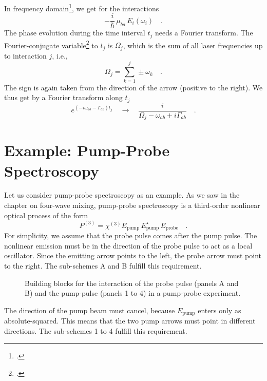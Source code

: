 In frequency domain\footcite{Boyd2008,Shen2003}, we get for the interactions
\begin{equation}
 - \frac{i}{\hbar} \, \mu_{ba} \, E_i(\omega_i)   \quad .
\end{equation}
The phase evolution during the time interval $t_j$ needs a Fourier transform.  The Fourier-conjugate variable\footcite{Tokmakoff09} to $t_j$  is $\Omega_j$, which is the sum of all laser frequencies up to interaction $j$, i.e.,
\begin{equation}
 \Omega_j = \sum_{k=1}^j \pm \omega_k \quad .
\end{equation}
The sign is again taken from the direction of the arrow (positive to the right). We thus get by a Fourier transform  along $t_j$ 
\begin{equation}
 e^{ (-i \omega_{ab} - \Gamma_{ab}) t_j }  \quad \rightarrow \quad
 \frac{i }{\Omega_j - \omega_{ab}  + i \Gamma_{ab} }  \quad .
\end{equation}




\section{Example: Pump-Probe Spectroscopy}

Let us consider pump-probe spectroscopy as an example. As we saw in the chapter on four-wave mixing, pump-probe spectroscopy is a third-order nonlinear optical process of the form
\begin{equation}
 P^{(3)} =  \chi^{(3)} E_\text{pump} \, E_\text{pump}^\star \, E_\text{probe} \quad .
\end{equation}
For simplicity, we assume that the probe pulse comes after the pump pulse. The nonlinear emission must be in the direction of the probe pulse to act as a local oscillator. Since the emitting arrow points to the left, the probe arrow must point to the right. The sub-schemes A and B fulfill this requirement.

\begin{figure}

\caption{
Building blocks for the interaction of the probe pulse (panels A and B) and the pump-pulse (panels 1 to 4) in a pump-probe experiment.}
\label{fig:2d_feynman_pp_elements}
\end{figure}

The direction of the pump beam must cancel, because $E_\text{pump} $ enters only as absolute-squared. This means that the two pump arrows must point in different directions. The sub-schemes 1 to 4 fulfill this requirement.

